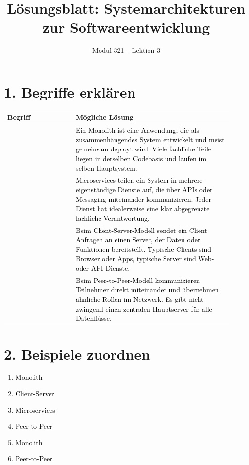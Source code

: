 \documentclass[11pt,a4paper]{article}
\title{\textbf{Lösungsblatt: Systemarchitekturen zur Softwareentwicklung}}
\author{Modul 321 -- Lektion 3}
\date{}
\newcommand{\term}[1]{\fcolorbox{black!20}{blue!6}{\strut #1}}
\newcommand{\solution}[1]{\textcolor{black}{#1}}
\begin{document}
\maketitle


\section*{1. Begriffe erklären}
\begin{longtable}{|>{\raggedright\arraybackslash}p{0.28\linewidth}|>{\raggedright\arraybackslash}p{0.64\linewidth}|}
\hline
\textbf{Begriff} & \textbf{Mögliche Lösung} \\
\hline
\term{Monolith} &
\solution{Ein Monolith ist eine Anwendung, die als zusammenhängendes System entwickelt und meist gemeinsam deployt wird. Viele fachliche Teile liegen in derselben Codebasis und laufen im selben Hauptsystem.} \\ \hline
\term{Microservices} &
\solution{Microservices teilen ein System in mehrere eigenständige Dienste auf, die über APIs oder Messaging miteinander kommunizieren. Jeder Dienst hat idealerweise eine klar abgegrenzte fachliche Verantwortung.} \\ \hline
\term{Client-Server} &
\solution{Beim Client-Server-Modell sendet ein Client Anfragen an einen Server, der Daten oder Funktionen bereitstellt. Typische Clients sind Browser oder Apps, typische Server sind Web- oder API-Dienste.} \\ \hline
\term{Peer-to-Peer} &
\solution{Beim Peer-to-Peer-Modell kommunizieren Teilnehmer direkt miteinander und übernehmen ähnliche Rollen im Netzwerk. Es gibt nicht zwingend einen zentralen Hauptserver für alle Datenflüsse.} \\ \hline
\end{longtable}

\section*{2. Beispiele zuordnen}
\begin{enumerate}
  \item \solution{Monolith}
  \item \solution{Client-Server}
  \item \solution{Microservices}
  \item \solution{Peer-to-Peer}
  \item \solution{Monolith}
  \item \solution{Peer-to-Peer}
\end{enumerate}
\end{document}
